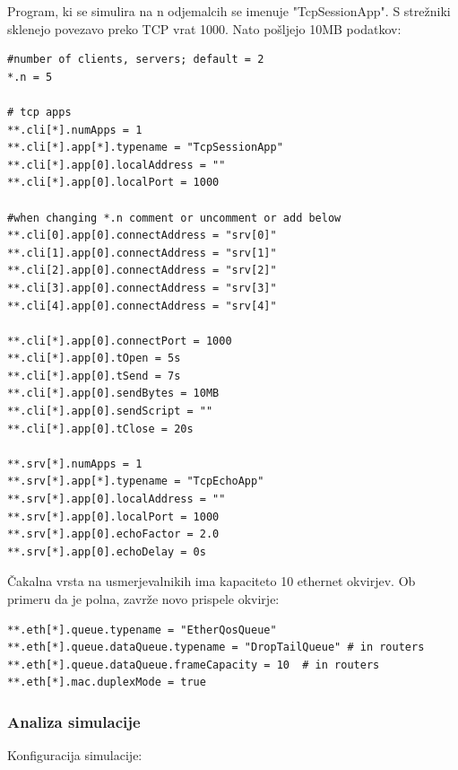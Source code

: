 \documentclass[11pt,a4paper,slovene]{myarticle}
\begin{document}
Program, ki se simulira na n odjemalcih se imenuje "TcpSessionApp". S strežniki sklenejo povezavo preko TCP vrat 1000. Nato pošljejo 10MB podatkov:
\begin{lstlisting}
#number of clients, servers; default = 2
*.n = 5

# tcp apps
**.cli[*].numApps = 1
**.cli[*].app[*].typename = "TcpSessionApp"
**.cli[*].app[0].localAddress = ""
**.cli[*].app[0].localPort = 1000

#when changing *.n comment or uncomment or add below
**.cli[0].app[0].connectAddress = "srv[0]"
**.cli[1].app[0].connectAddress = "srv[1]"
**.cli[2].app[0].connectAddress = "srv[2]"
**.cli[3].app[0].connectAddress = "srv[3]"
**.cli[4].app[0].connectAddress = "srv[4]"

**.cli[*].app[0].connectPort = 1000
**.cli[*].app[0].tOpen = 5s
**.cli[*].app[0].tSend = 7s
**.cli[*].app[0].sendBytes = 10MB
**.cli[*].app[0].sendScript = ""
**.cli[*].app[0].tClose = 20s

**.srv[*].numApps = 1
**.srv[*].app[*].typename = "TcpEchoApp"
**.srv[*].app[0].localAddress = ""
**.srv[*].app[0].localPort = 1000
**.srv[*].app[0].echoFactor = 2.0
**.srv[*].app[0].echoDelay = 0s
\end{lstlisting}

Čakalna vrsta na usmerjevalnikih ima kapaciteto 10 ethernet okvirjev. Ob primeru da je polna, zavrže novo prispele okvirje:
\begin{lstlisting}
**.eth[*].queue.typename = "EtherQosQueue"
**.eth[*].queue.dataQueue.typename = "DropTailQueue" # in routers
**.eth[*].queue.dataQueue.frameCapacity = 10  # in routers
**.eth[*].mac.duplexMode = true
\end{lstlisting}


\subsubsection{Analiza simulacije}

Konfiguracija simulacije:
\end{document}

